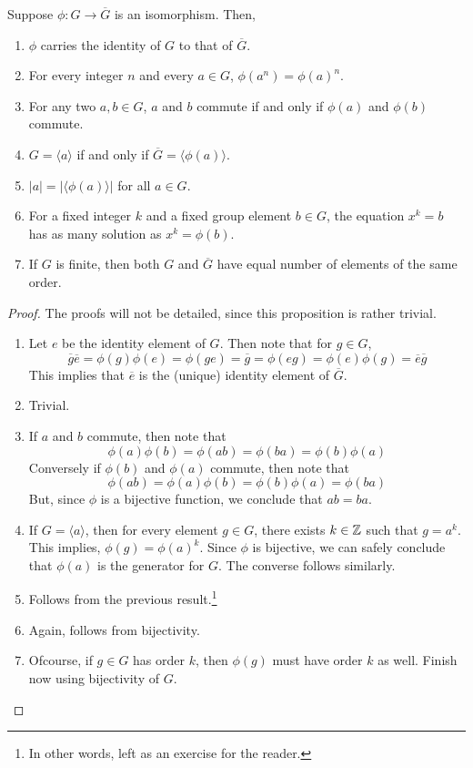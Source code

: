 \begin{proposition}
	Suppose $\phi:G\to\overline{G}$ is an isomorphism. Then,
	\begin{enumerate}
		\item $\phi$ carries the identity of $G$ to that of $\overline{G}$.
		\item For every integer $n$ and every $a\in G$, $\phi(a^n)=\phi(a)^n$.
		\item For any two $a,b\in G$, $a$ and $b$ commute if and only if $\phi(a)$ and $\phi(b)$ commute.
		\item $G=\langle a\rangle$ if and only if $\overline{G}=\langle\phi(a)\rangle$.
		\item $|a|=|\langle\phi(a)\rangle|$ for all $a\in G$.
		\item For a fixed integer $k$ and a fixed group element $b\in G$, the equation $x^k=b$ has as many solution as $x^k=\phi(b)$.
		\item If $G$ is finite, then both $G$ and $\overline{G}$ have equal number of elements of the same order.
	\end{enumerate}
\end{proposition}
\begin{proof}The proofs will not be detailed, since this proposition is rather trivial.
	\begin{enumerate}
		\item Let $e$ be the identity element of $G$. Then note that for $g\in G$,
		$$\overline{g}\overline{e}=\phi(g)\phi(e)=\phi(ge)=\overline{g}=\phi(eg)=\phi(e)\phi(g)=\overline{e}\overline{g}$$
		This implies that $\overline{e}$ is the (unique) identity element of $\overline{G}$.
		\item Trivial.
		\item If $a$ and $b$ commute, then note that 
		$$
		\phi(a)\phi(b) = \phi(ab) = \phi(ba) = \phi(b)\phi(a)
		$$
		Conversely if $\phi(b)$ and $\phi(a)$ commute, then note that 
		$$
		\phi(ab) = \phi(a)\phi(b) = \phi(b)\phi(a) = \phi(ba)
		$$
		But, since $\phi$ is a bijective function, we conclude that $ab=ba$.
		\item If $G=\langle a\rangle$, then for every element $g\in G$, there exists $k\in\mathbb{Z}$ such that $g=a^k$. This implies, $\phi(g)=\phi(a)^k$. Since $\phi$ is bijective, we can safely conclude that $\phi(a)$ is the generator for $G$. The converse follows similarly.
		\item Follows from the previous result.\footnote{In other words, left as an exercise for the reader.}
		\item Again, follows from bijectivity.
		\item Ofcourse, if $g\in G$ has order $k$, then $\phi(g)$ must have order $k$ as well. Finish now using bijectivity of $G$.
	\end{enumerate}
\end{proof}

